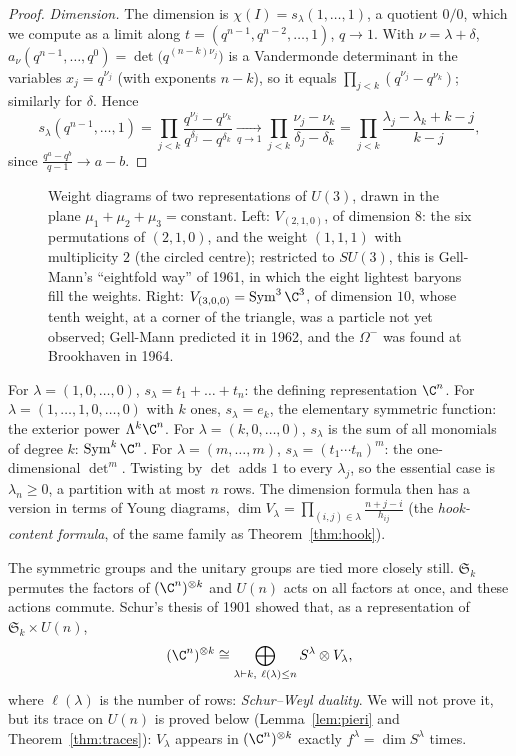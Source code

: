 \begin{proof}
\emph{Dimension.} The dimension is $\chi(I)=s_\lambda(1,\dots,1)$, a quotient $0/0$, which we compute as a limit along $t=(q^{n-1},q^{n-2},\dots,1)$, $q\to1$. With $\nu=\lambda+\delta$, $a_\nu(q^{n-1},\dots,q^0)=\det\bigl(q^{(n-k)\nu_j}\bigr)$ is a Vandermonde
determinant in the variables $x_j=q^{\nu_j}$ (with exponents $n-k$), so it equals $\prod_{j<k}(q^{\nu_j}-q^{\nu_k})$; similarly for $\delta$. Hence
\[
s_\lambda(q^{n-1},\dots,1)=\prod_{j<k}\frac{q^{\nu_j}-q^{\nu_k}}{q^{\delta_j}-q^{\delta_k}}\xrightarrow[q\to1]{}\prod_{j<k}\frac{\nu_j-\nu_k}{\delta_j-\delta_k}=\prod_{j<k}\frac{\lambda_j-\lambda_k+k-j}{k-j},
\]
since $\frac{q^a-q^b}{q-1}\to a-b$.
\end{proof}

\begin{figure}[ht]
\centering
{}
\caption{Weight diagrams of two representations of $U(3)$, drawn in the plane $\mu_1+\mu_2+\mu_3=\text{constant}$. Left: $V_{(2,1,0)}$, of dimension $8$: the six permutations of $(2,1,0)$, and the weight $(1,1,1)$ with multiplicity $2$ (the circled centre); restricted to $SU(3)$,
this is Gell-Mann's ``eightfold way'' of 1961, in which the eight lightest baryons fill the weights. Right: $V_{(3,0,0)}=\operatorname{Sym}^3\C^3$, of dimension $10$, whose tenth weight, at a corner of the triangle, was a particle not yet observed; Gell-Mann
predicted it in 1962, and the $\Omega^-$ was found at Brookhaven in 1964.}
\label{fig:weights}
\end{figure}

For $\lambda=(1,0,\dots,0)$, $s_\lambda=t_1+\dots+t_n$: the defining representation $\C^n$. For $\lambda=(1,\dots,1,0,\dots,0)$ with $k$ ones, $s_\lambda=e_k$, the elementary symmetric function: the exterior power $\Lambda^k\C^n$. For $\lambda=(k,0,\dots,0)$, $s_\lambda$ is
the sum of all monomials of degree $k$: $\operatorname{Sym}^k\C^n$. For $\lambda=(m,\dots,m)$, $s_\lambda=(t_1\cdots t_n)^m$: the one-dimensional $\det^m$. Twisting by $\det$ adds $1$ to every $\lambda_j$, so the essential case is $\lambda_n\ge0$, a partition with at most
$n$ rows. The dimension formula then has a version in terms of Young diagrams, $\dim V_\lambda=\prod_{(i,j)\in\lambda}\frac{n+j-i}{h_{ij}}$ (the \emph{hook-content formula}, of the same family as Theorem~\ref{thm:hook}).

The symmetric groups and the unitary groups are tied more closely still. $\mathfrak S_k$ permutes the factors of $(\C^n)^{\otimes k}$ and $U(n)$ acts on all factors at once, and these actions commute. Schur's thesis of 1901 showed that, as a representation of
$\mathfrak S_k\times U(n)$,
\[
(\C^n)^{\otimes k}\cong\bigoplus_{\lambda\vdash k,\ \ell(\lambda)\le n}S^\lambda\otimes V_\lambda,
\]
where $\ell(\lambda)$ is the number of rows: \emph{Schur--Weyl duality}. We will not prove it, but its trace on $U(n)$ is proved below (Lemma~\ref{lem:pieri} and Theorem~\ref{thm:traces}): $V_\lambda$ appears in $(\C^n)^{\otimes k}$ exactly $f^\lambda=\dim S^\lambda$ times.

